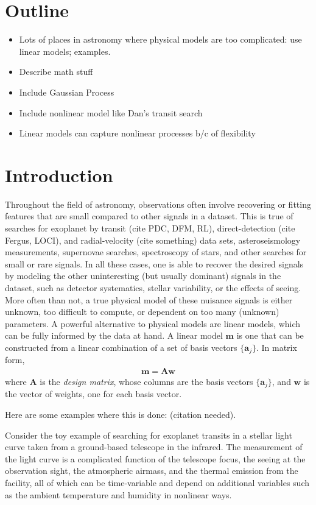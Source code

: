 \documentclass[modern]{rnaastex}
\newcommand{\bvec}[1]{{\ensuremath{\boldsymbol{#1}}}}
\newcommand{\citeme}{{\color{red}(citation needed)}}
\begin{document}
\section{Outline}

\begin{itemize}
\item Lots of places in astronomy where physical models are too complicated: use linear models; examples.
\item Describe math stuff
\item Include Gaussian Process
\item Include nonlinear model like Dan's transit search
\item Linear models can capture nonlinear processes b/c of flexibility
\end{itemize}

\section{Introduction}

Throughout the field of astronomy, observations often involve recovering or fitting features that are small compared to other signals in a dataset. This is true of searches for exoplanet by transit (cite PDC, DFM, RL), direct-detection (cite Fergus, LOCI), and radial-velocity  (cite something) data sets, asteroseismology measurements, supernovae searches, spectroscopy of stars, and other searches for small or rare signals. In all these cases, one is able to recover the desired signals by modeling the other uninteresting (but usually dominant) signals in the dataset, such as detector systematics, stellar variability, or the effects of seeing. More often than not, a true physical model of these nuisance signals is either unknown, too difficult to compute, or dependent on too many (unknown) parameters. A powerful alternative to physical models are linear models, which can be fully informed by the data at hand. A linear model $\bvec{m}$ is one that can be constructed from a linear combination of a set of basis vectors $\{\bvec{a}_j\}$. In matrix form,
%
\begin{align}
\bvec{m} = \bvec{A} \bvec{w}
\end{align}
%
where $\bvec{A}$ is the \emph{design matrix}, whose columns are the basis vectors $\{\bvec{a}_j\}$, and $\bvec{w}$ is the vector of weights, one for each basis vector.

Here are some examples where this is done: \citeme.

Consider the toy example of searching for exoplanet transits in a stellar light curve taken from a ground-based telescope in the infrared. The measurement of the light curve is a complicated function of the telescope focus, the seeing at the observation sight, the atmospheric airmass, and the thermal emission from the facility, all of which can be time-variable and depend on additional variables such as the ambient temperature and humidity in nonlinear ways.
\end{document}
